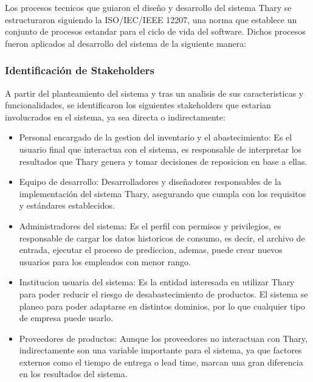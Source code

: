 Los procesos tecnicos que guiaron el diseño y desarrollo del sistema Thary se estructuraron siguiendo la ISO/IEC/IEEE 12207, una norma que establece un conjunto de procesos estandar para el ciclo de vida del software. Dichos procesos fueron aplicados al desarrollo del sistema de la siguiente manera:

\subsubsection{Identificación de Stakeholders}
\label{sec:stakeholders}
A partir del planteamiento del sistema y tras un analisis de sus caracteristicas y funcionalidades, se identificaron los siguientes stakeholders que estarian involucrados en el sistema, ya sea directa o indirectamente:

\begin{itemize}
    \item Personal encargado de la gestion del inventario y el abastecimiento: Es el usuario final que interactua con el sistema, es responsable de interpretar los resultados que Thary genera y tomar decisiones de reposicion en base a ellas.
    \item Equipo de desarrollo: Desarrolladores y diseñadores responsables de la implementación del sistema Thary, asegurando que cumpla con los requisitos y estándares establecidos.
    \item Administradores del sistema: Es el perfil con permisos y privilegios, es responsable de cargar los datos historicos de consumo, es decir, el archivo de entrada, ejecutar el proceso de prediccion, ademas, puede crear nuevos usuarios para los empleados con menor rango.
    \item Institucion usuaria del sistema: Es la entidad interesada en utilizar Thary para poder reducir el riesgo de desabastecimiento de productos. El sistema se planeo para poder adaptarse en distintos dominios, por lo que cualquier tipo de empresa puede usarlo.
    \item Proveedores de productos: Aunque los proveedores no interactuan con Thary, indirectamente son una variable importante para el sistema, ya que factores externos como el tiempo de entrega o lead time, marcan una gran diferencia en los resultados del sistema.
\end{itemize} 

